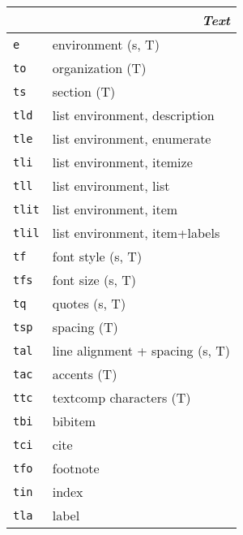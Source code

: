 \documentclass[oneside,10pt,landscape,DIV16]{scrartcl}
\newcommand{\Map}[1] {\textbf{\textasciiacute}\texttt{#1}}
\begin{document}
\begin{multicols}{3}
\begin{center}
%
\begin{tabular}[]{|p{11mm}|p{60mm}|}
\hline
\multicolumn{2}{|r|}{\textsl{\textbf{T}ext}}                 \\[1.0ex]
\hline \Map{e}    & environment                    \hfill (s, T)\\
\hline \Map{to}   & organization                   \hfill (T)\\
\hline \Map{ts}   & section                        \hfill (T)\\
\hline \Map{tld}  & list environment, description  \\
\hline \Map{tle}  & list environment, enumerate    \\
\hline \Map{tli}  & list environment, itemize      \\
\hline \Map{tll}  & list environment, list         \\
\hline \Map{tlit} & list environment, item         \\
\hline \Map{tlil} & list environment, item+labels  \\
\hline \Map{tf}   & font style                     \hfill (s, T)\\
\hline \Map{tfs}  & font size                      \hfill (s, T)\\
\hline \Map{tq}   & quotes                         \hfill (s, T)\\
\hline \Map{tsp}  & spacing                        \hfill (T)\\
\hline \Map{tal}  & line alignment + spacing       \hfill (s, T)\\
\hline \Map{tac}  & accents                        \hfill (T)\\
\hline \Map{ttc}  & textcomp characters            \hfill (T)\\
\hline
\hline \Map{tbi}  & bibitem                        \\
\hline \Map{tci}  & cite                           \\
\hline \Map{tfo}  & footnote                       \\
\hline \Map{tin}  & index                          \\
\hline \Map{tla}  & label                          \\

\end{tabular}
\end{center}
\end{multicols}
\end{document}
